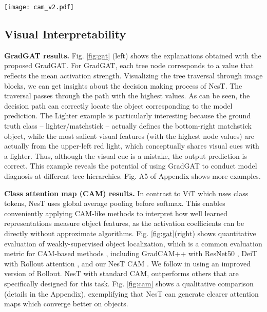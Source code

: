 \documentclass{article}
\newcommand{\topic}[1]{\noindent \textbf{#1}}
\newcommand{\OURS}{NesT\xspace}
\begin{document}
\begin{figure*}[h] 
\centering
\texttt{[image: cam\_v2.pdf]} 
\caption{Visualization of CAM-based attention results. 
All models are trained on ImageNet. 
CAM (vanilla) with \OURS achieves accurate attention patterns on object regions, yielding finer attention to objects than DeiT Rollout \cite{abnar2020quantifying} and less noise than ResNet50 GradCAM++ \cite{chattopadhay2018grad}. } \vspace{-.2cm}
\label{fig:cam}
\end{figure*} 



\subsection{Visual Interpretability}

\topic{GradGAT results.}
Fig. \ref{fig:gat} (left) shows the explanations obtained with the proposed GradGAT.
For GradGAT, each tree node corresponds to a value that reflects the mean activation strength. Visualizing the tree traversal through image blocks, we can get insights about the decision making process of \OURS. 
The traversal passes through the path with the highest values. As can be seen, the decision path can correctly locate the object corresponding to the model prediction.
The Lighter example is particularly interesting because the ground truth class -- lighter/matchstick -- actually defines the bottom-right matchstick object, while the most salient visual features (with the highest node values) are actually from the upper-left red light, which conceptually shares visual cues with a lighter. Thus, although the visual cue is a mistake, the output prediction is correct. This example reveals the potential of using GradGAT to conduct model diagnosis at different tree hierarchies.
Fig. A5 of Appendix shows more examples.
 
\topic{Class attention map (CAM) results.} 
In contrast to ViT \cite{dosovitskiy2020image} which uses class tokens, \OURS uses global average pooling before softmax.
This enables conveniently applying CAM-like \cite{zhou2016learning} methods to interpret how well learned representations measure object features, as the activation coefficients can be directly without approximate algorithms.
Fig. \ref{fig:gat}(right) shows quantitative evaluation of weakly-supervised object localization, which is a common evaluation metric for CAM-based methods \cite{zhou2016learning}, including GradCAM++ \cite{chattopadhay2018grad} with ResNet50 \cite{he2016deep}, DeiT with Rollout attention \cite{abnar2020quantifying}, and our \OURS CAM \cite{zhou2016learning}. 
We follow \cite{gildenblat2021explorerollout} in using an improved version of Rollout.
\OURS with standard CAM, outperforms others that are specifically designed for this task. 
Fig. \ref{fig:cam} shows a qualitative comparison (details in the Appendix), exemplifying that \OURS can generate clearer attention maps which converge better on objects.
\end{document}
